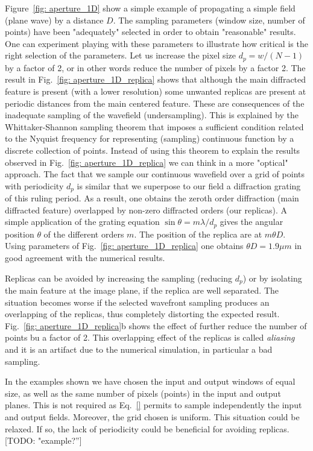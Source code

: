 \documentclass{iucr}              %
\newcommand{\todo}[1]{{\color{red}[TODO: "#1'']}}
\begin{document}
Figure~\ref{fig: aperture_1D} show a simple example of propagating a simple field (plane wave) by a distance $D$. The sampling parameters (window size, number of points) have been "adequately" selected in order to obtain "reasonable" results. One can experiment playing with these parameters to illustrate how critical is the right selection of the parameters. Let us increase the pixel size $d_p=w/(N-1)$ by a factor of 2, or in other words reduce the number of pixels by a factor 2. The result in Fig.~\ref{fig: aperture_1D_replica} shows that although the main diffracted feature is present (with a lower resolution) some unwanted replicas are present at periodic distances from the main centered feature. These are consequences of the inadequate sampling of the wavefield (undersampling). This is explained by the Whittaker-Shannon sampling theorem that imposes a sufficient condition related to the Nyquist frequency for representing (sampling) continuous function by a discrete collection of points. Instead of using this theorem to explain the results observed in Fig.~\ref{fig: aperture_1D_replica} we can think in a more "optical" approach. The fact that we sample our continuous wavefield over a grid of points with periodicity $d_p$ is similar that we superpose to our field a diffraction grating of this ruling period. As a result, one obtains the zeroth order diffraction (main diffracted feature) overlapped by non-zero diffracted orders (our replicas). A simple application of the grating equation $\sin \theta = m \lambda / d_p $ gives the angular position $\theta$ of the different orders $m$. The position of the replica are at $m \theta D$. Using parameters of Fig.~\ref{fig: aperture_1D_replica} one obtains $\theta D= 1.9 \mu m$ in good agreement with the numerical results. 

Replicas can be avoided by increasing the sampling (reducing $d_p$) or by isolating the main feature at the image plane, if the replica are well separated. The situation becomes worse if the selected wavefront sampling produces an overlapping of the replicas, thus completely distorting the expected result. Fig.~\ref{fig: aperture_1D_replica}b shows the effect of further reduce the number of points bu a factor of 2. This overlapping effect of the replicas is called {\it aliasing} and it is an artifact due to the numerical simulation, in particular a bad sampling. 

In the examples shown we have chosen the input and output windows of equal size, as well as the same number of pixels (points) in the input and output planes. This is not required as Eq.~\ref{} permits to sample independently the input and output fields. Moreover, the grid chosen is uniform. This situation could be relaxed. If so, the lack of periodicity could be beneficial for avoiding replicas. \todo{example?}
\end{document}
